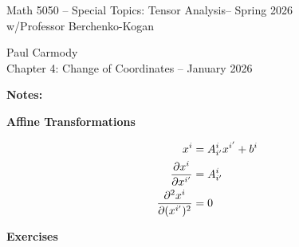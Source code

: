 \documentclass[12pt,a4paper]{report}
\newcommand{\CLASSNAME}{Math 5050 -- Special Topics: Tensor Analysis}
\newcommand{\STUDENTNAME}{Paul Carmody}
\newcommand{\ASSIGNMENT}{Chapter 4: Change of Coordinates }
\newcommand{\DUEDATE}{January 2026}
\newcommand{\PROFESSOR}{Professor Berchenko-Kogan}
\newcommand{\SEMESTER}{Spring 2026}
\begin{document}
\begin{center}
	\Large{\CLASSNAME -- \SEMESTER} \\
	\large{ w/\PROFESSOR}
\end{center}
\begin{center}
	\STUDENTNAME \\
	\ASSIGNMENT -- \DUEDATE\\
\end{center} 

\noindent\textbf{Notes:}

\begin{description}
	\item \textbf{Affine Transformations}
	
	\begin{align*}
		x^i &= A_{i'}^{i}x^{i'}+b^{i} \\
		\frac{\partial x^i}{\partial x^{i'}} &= A_{i'}^{i} \\
		\frac{\partial^2 x^i}{\partial (x^{i'})^2} &= 0
	\end{align*}
\end{description}
\HLINE
\noindent\textbf{\Large{Exercises}}
\end{document}
